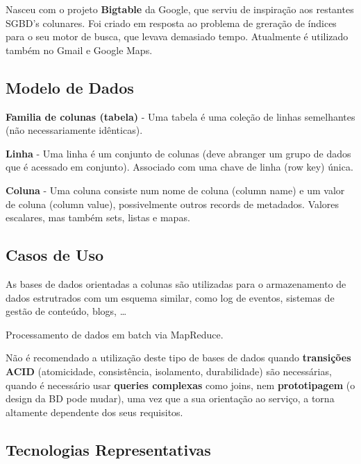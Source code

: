 \documentclass{article}
\begin{document}
\vspace{2mm}

Nasceu com o projeto \textbf{Bigtable} da Google, que serviu de inspiração
aos restantes SGBD's colunares. Foi criado em resposta ao problema de greração
de índices para o seu motor de busca, que levava demasiado tempo.
Atualmente é utilizado também no Gmail e Google Maps.

\pagebreak

\subsection{Modelo de Dados}

\begin{flushleft}
  \textbf{Familia de colunas (tabela)} - Uma tabela é uma coleção de linhas semelhantes
  (não necessariamente idênticas).

  \textbf{Linha} - Uma linha é um conjunto de colunas (deve abranger um grupo de dados
  que é acessado em conjunto).
  Associado com uma chave de linha (row key) única.

  \textbf{Coluna} - Uma coluna consiste num nome de coluna (column name)
  e um valor de coluna (column value), possivelmente outros records de metadados.
  Valores escalares, mas também sets, listas e mapas.
\end{flushleft}

\subsection{Casos de Uso}

As bases de dados orientadas a colunas são utilizadas para o armazenamento de
dados estrutrados com um esquema similar, como log de eventos, sistemas de
gestão de conteúdo, blogs, \dots

Processamento de dados em batch via MapReduce.

\vspace{2mm}

Não é recomendado a utilização deste tipo de bases de dados quando
\textbf{transições ACID} (atomicidade, consistência, isolamento, durabilidade) são necessárias,
quando é necessário usar \textbf{queries complexas} como joins, nem \textbf{prototipagem} (o design da BD pode mudar), uma vez que a
sua orientação ao serviço, a torna altamente dependente dos seus requisitos.

\subsection{Tecnologias Representativas}
\end{document}
